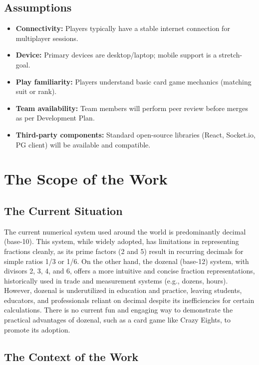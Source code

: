\documentclass[12pt]{article}
\begin{document}
\subsection{Assumptions}
\begin{itemize}
  \item \textbf{Connectivity:} Players typically have a stable internet connection for multiplayer sessions.
  \item \textbf{Device:} Primary devices are desktop/laptop; mobile support is a stretch-goal.
  \item \textbf{Play familiarity:} Players understand basic card game mechanics (matching suit or rank).
  \item \textbf{Team availability:} Team members will perform peer review before merges as per Development Plan.
  \item \textbf{Third-party components:} Standard open-source libraries (React, Socket.io, PG client) will be available and compatible.
\end{itemize}

\section{The Scope of the Work}
\subsection{The Current Situation}

The current numerical system used around the world is predominantly decimal (base-10). This system, while widely adopted, has limitations in representing fractions cleanly, as its prime factors (2 and 5) result in recurring decimals for simple ratios 1/3 or 1/6. On the other hand, the dozenal (base-12) system, with divisors 2, 3, 4, and 6, offers a more intuitive and concise fraction representations, historically used in trade and measurement systems (e.g., dozens, hours). However, dozenal is underutilized in education and practice, leaving students, educators, and professionals reliant on decimal despite its inefficiencies for certain calculations. There is no current fun and engaging way to demonstrate the practical advantages of dozenal, such as a card game like Crazy Eights, to promote its adoption.

\subsection{The Context of the Work}
\end{document}
